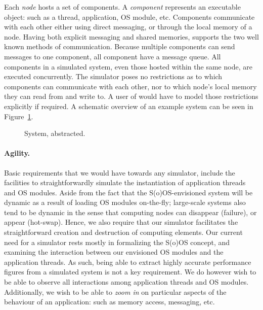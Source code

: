 Each \emph{node} hosts a set of components.  A \emph{component}
represents an executable object: such as a thread, application, OS
module, etc.  Components communicate with each other either using
direct messaging, or through the local memory of a node.  Having both
explicit messaging and shared memories, \soosim supports the two well
known methods of communication.  Because multiple components can send
messages to one component, all component have a message queue.  All
components in a simulated system, even those hosted within the same
node, are executed concurrently.  The simulator poses no restrictions
as to which components can communicate with each other, nor to which
node's local memory they can read from and write to.  A user of
\soosim would have to model those restrictions explicitly if required.
A schematic overview of an example system can be seen in
Figure~\ref{fig:system}.

\def\svgwidth{\columnwidth}
\begin{figure}
%
\caption{System, abstracted.}
\label{fig:system}
\end{figure}

\paragraph{Agility.} Basic requirements that we would have towards
any simulator, include the facilities to straightforwardly simulate
the instantiation of application threads and OS modules.  Aside from
the fact that the S(o)OS-envisioned system will be dynamic as a result
of loading OS modules on-the-fly; large-scale systems also tend to be
dynamic in the sense that computing nodes can disappear (failure), or
appear (hot-swap).  Hence, we also require that our simulator
facilitates the straightforward creation and destruction of computing
elements.  Our current need for a simulator rests mostly in
formalizing the S(o)OS concept, and examining the interaction between
our envisioned OS modules and the application threads.  As such, being
able to extract highly accurate performance figures from a simulated
system is not a key requirement.  We do however wish to be able to
observe all interactions among application threads and OS modules.
Additionally, we wish to be able to \emph{zoom in} on particular
aspects of the behaviour of an application: such as memory access,
messaging, etc.






